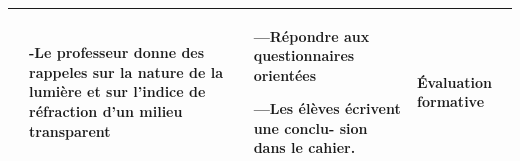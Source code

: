\documentclass[12pt]{article}
\begin{document}
\begin{center}
\begin{tabular}{|p{}||p{}||p{}||p{}|}
				  &
-Le professeur  donne des rappeles sur la nature de la lumière et sur l'indice de réfraction d’un milieu transparent









				  &



---Répondre aux questionnaires orientées

---Les élèves écrivent une conclu-
sion dans le cahier.
				  & 
	Évaluation formative\\\hline		  
\end{tabular}
\end{center}

\end{document}
